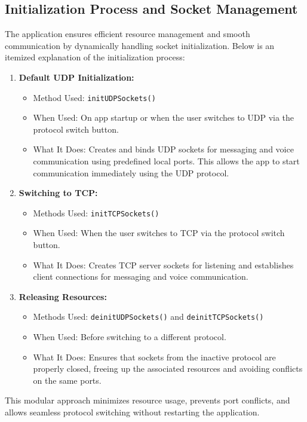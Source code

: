 \documentclass{article}
\begin{document}
\subsection{Initialization Process and Socket Management}
The application ensures efficient resource management and smooth communication by dynamically handling socket initialization. Below is an 
itemized explanation of the initialization process:

\begin{enumerate}
\item \textbf{Default UDP Initialization:}
        \begin{itemize}  
        \item Method Used: \texttt{initUDPSockets()}
        \item When Used: On app startup or when the user switches to UDP via the protocol switch button.
        \item What It Does: Creates and binds UDP sockets for messaging and voice communication using predefined local ports. This allows the app to start 
        communication immediately using the UDP protocol.
        \end{itemize}
\item \textbf{Switching to TCP:}
        \begin{itemize}
        \item Methods Used: \texttt{initTCPSockets()}
        \item When Used: When the user switches to TCP via the protocol switch button.
        \item What It Does: Creates TCP server sockets for listening and establishes client connections for messaging and voice communication.
        \end{itemize}

\item \textbf{Releasing Resources:}
        \begin{itemize}
        \item Methods Used: \texttt{deinitUDPSockets()} and \texttt{deinitTCPSockets()} 
        \item When Used: Before switching to a different protocol.
        \item What It Does: Ensures that sockets from the inactive protocol are properly closed, freeing up the associated resources and avoiding conflicts on the same ports.
        \end{itemize}
\end{enumerate}
This modular approach minimizes resource usage, prevents port conflicts, and allows seamless protocol switching without restarting the application.\
\end{document}
